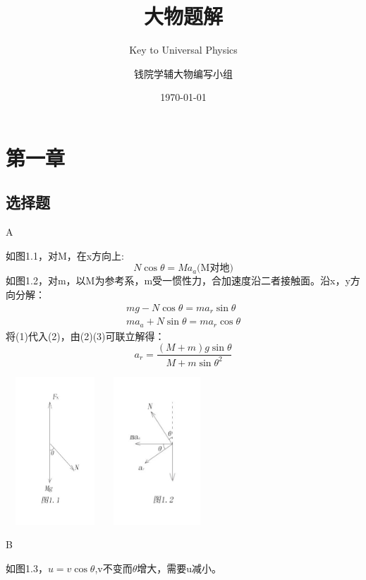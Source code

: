 \documentclass[b5paper,opensource]{./template/qyxf-book}
\title{大物题解}
\subtitle{Key to Universal Physics}
\author{钱院学辅大物编写小组}
\date{\today}
\begin{document}
\maketitle
\tableofcontents
\chapter{第一章}
\section{选择题}

A

\solve 如图1.1，对M，在x方向上:
\begin{equation}
N\cos\theta=Ma_a\text{(M对地)}
\end{equation}
如图1.2，对m，以M为参考系，m受一惯性力，合加速度沿二者接触面。沿x，y方向分解：
\begin{gather}
mg-N\cos\theta=ma_r\sin\theta\\
ma_a+N\sin\theta=ma_r\cos\theta
\end{gather}
将(1)代入(2)，由(2)(3)可联立解得：
\[
a_r=\dfrac{(M+m)g\sin\theta}{M+m{\sin\theta}^2}
\]

\centerline{\includegraphics[width=10em,height=15em]{Chp1_illus1.png}
\quad\includegraphics[width=10em,height=15em]{Chp1_illus2.png}}


B

\solve 如图1.3，$u=v\cos\theta$,v不变而$\theta$增大，需要u减小。
\end{document}
